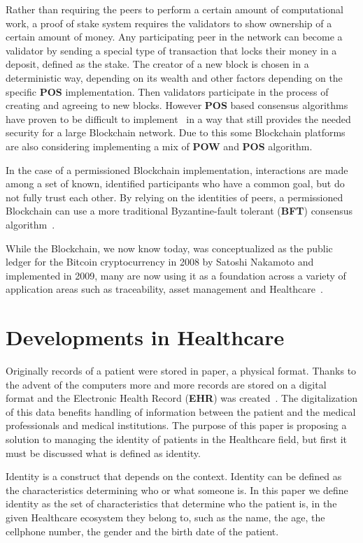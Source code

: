 Rather than requiring the peers to perform a certain amount of computational
work, a proof of stake system requires the validators to show ownership of a
certain amount of money. Any participating peer in the network can become a
validator by sending a special type of transaction that locks their money in a
deposit, defined as the stake. The creator of a new block is chosen in a
deterministic way, depending on its wealth and other factors depending on the
specific \textbf{POS} implementation. Then validators participate in the
process of creating and agreeing to new blocks. However \textbf{POS} based
consensus algorithms have proven to be difficult to
implement~\cite{EthereumSlasher2014} in a way that still provides the needed
security for a large Blockchain network. Due to this some Blockchain platforms
are also considering implementing a mix of \textbf{POW} and \textbf{POS}
algorithm.

In the case of a permissioned Blockchain implementation, interactions are made
among a set of known, identified participants who have a common goal, but do
not fully trust each other. By relying on the identities of peers, a
permissioned Blockchain can use a more traditional Byzantine-fault tolerant
(\textbf{BFT}) consensus algorithm~\cite{Sousa2018}.

While the Blockchain, we now know today, was conceptualized as the public
ledger for the Bitcoin cryptocurrency in 2008 by Satoshi Nakamoto and
implemented in 2009, many are now using it as a foundation across a variety of
application areas such as traceability, asset management and
Healthcare~\cite{MIT2016}.

\section{Developments in Healthcare}
\label{blockchainHealthcare}

Originally records of a patient were stored in paper, a physical format.
Thanks to the advent of the computers more and more records are stored on a
digital format and the Electronic Health Record (\textbf{EHR}) was
created~\cite{Marquez2017}. The digitalization of this data benefits handling
of information between the patient and the medical professionals and medical
institutions\cite{ONCoordinator2017}.  The purpose of this paper is proposing a
solution to managing the identity of patients in the Healthcare field, but
first it must be discussed what is defined as identity.

Identity is a construct that depends on the context. Identity can be defined as
the characteristics determining who or what someone is. In this paper we define
identity as the set of characteristics that determine who the patient is, in
the given Healthcare ecosystem they belong to, such as the name, the age, the
cellphone number, the gender and the birth date of the patient.  

